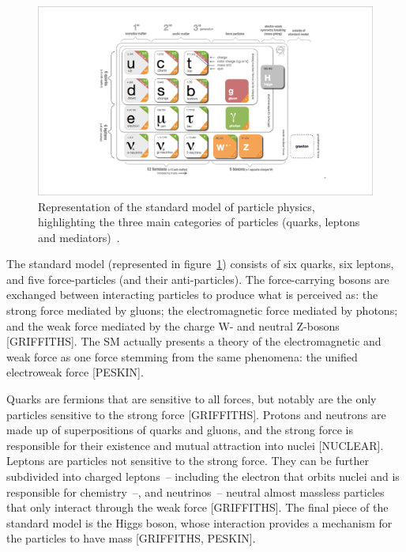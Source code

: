 \begin{figure}
    \centering
    \includegraphics[width = \textwidth]{figures/standardmodel_galbraith_carsten.png}
    \caption{Representation of the standard model of particle physics, highlighting the three main categories of particles (quarks, leptons and mediators)~\cite{galbraith_ux_2013}.}
    \label{fig:standard_model}
\end{figure}

The standard model (represented in figure~\ref{fig:standard_model}) consists of six quarks, six leptons, and five force-particles (and their anti-particles). The force-carrying bosons are exchanged between interacting particles to produce what is perceived as: the strong force mediated by gluons; the electromagnetic force mediated by photons; and the weak force mediated by the charge W- and neutral Z-bosons [GRIFFITHS]. The SM actually presents a theory of the electromagnetic and weak force as one force stemming from the same phenomena: the unified electroweak force [PESKIN]. 

Quarks are fermions that are sensitive to all forces, but notably are the only particles sensitive to the strong force [GRIFFITHS]. Protons and neutrons are made up of superpositions of quarks and gluons, and the strong force is responsible for their existence and mutual attraction into nuclei [NUCLEAR]. Leptons are particles not sensitive to the strong force. They can be further subdivided into charged leptons~-- including the electron that orbits nuclei and is responsible for chemistry~--, and neutrinos~-- neutral almost massless particles that only interact through the weak force [GRIFFITHS]. The final piece of the standard model is the Higgs boson, whose interaction provides a mechanism for the particles to have mass [GRIFFITHS, PESKIN].

